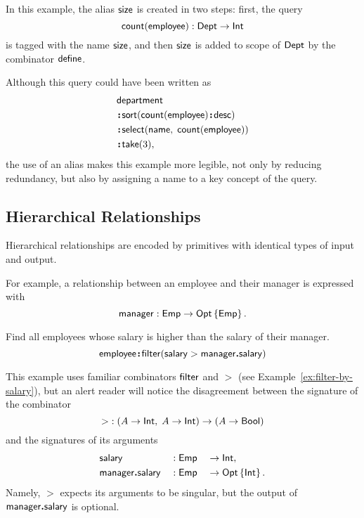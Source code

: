 In this example, the alias $\textup{\textsf{size}}$ is created in two steps: first, the query
\begin{equation*}
    \textup{\textsf{count}}(\textup{\textsf{employee}}): \textup{\textsf{Dept}} \to \textup{\textsf{Int}}
\end{equation*}
is tagged with the name $\textup{\textsf{size}}$, and then $\textup{\textsf{size}}$ is added to scope of $\textup{\textsf{Dept}}$
by the combinator $\textup{\textsf{define}}$.

Although this query could have been written as
\begin{align*}
    & \Department \\
    & \Apply\Sort(\Count(\Employee)\Apply\Desc) \\
    & \Apply\Select(\Name,\; \Count(\Employee)) \\
    & \Apply\Take(3),
\end{align*}
the use of an alias makes this example more legible, not only by reducing
redundancy, but also by assigning a name to a key concept of the query.

\subsection*{Hierarchical Relationships}

Hierarchical relationships are encoded by primitives with identical types of
input and output.

For example, a relationship between an employee and their manager is expressed
with
\begin{equation*}
    \textup{\textsf{manager}} : \textup{\textsf{Emp}} \to \textup{\textsf{Opt}}\left\{\textup{\textsf{Emp}}\right\}.
\end{equation*}

\begin{example}
    \label{ex:employee-filter-salary-manager}
    Find all employees whose salary is higher than the salary of their manager.
    \begin{equation*}
        \textup{\textsf{employee}}\!\boldsymbol{:}\!\textup{\textsf{filter}}(\textup{\textsf{salary}}>\textup{\textsf{manager}}\boldsymbol{.}\textup{\textsf{salary}})
    \end{equation*}
\end{example}

This example uses familiar combinators $\textup{\textsf{filter}}$ and ${>}$ (see
Example~\ref{ex:filter-by-salary}), but an alert reader will notice the
disagreement between the signature of the combinator
\begin{equation*}
    {>} : (A \to \textup{\textsf{Int}},\; A \to \textup{\textsf{Int}}) \to (A \to \textup{\textsf{Bool}})
\end{equation*}
and the signatures of its arguments
\begin{alignat*}{3}
    & \textup{\textsf{salary}} && : \textup{\textsf{Emp}} && \to \textup{\textsf{Int}}, \\
    & \textup{\textsf{manager}}\boldsymbol{.}\textup{\textsf{salary}} && : \textup{\textsf{Emp}} && \to \textup{\textsf{Opt}}\left\{\textup{\textsf{Int}}\right\}.
\end{alignat*}
Namely, ${>}$ expects its arguments to be singular, but the output of
$\textup{\textsf{manager}}\boldsymbol{.}\textup{\textsf{salary}}$ is optional.

